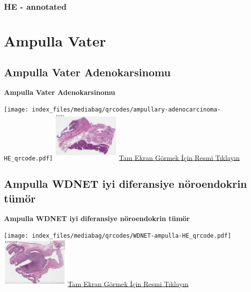 \documentclass[
  letterpaper,
  DIV=11,
  numbers=noendperiod]{scrreprt}
\begin{document}
\hypertarget{he---annotated-1}{%
\subsection{HE - annotated}\label{he---annotated-1}}

\hypertarget{sec-ampulla-vater}{%
\chapter{Ampulla Vater}\label{sec-ampulla-vater}}

\hypertarget{sec-ampulla-vater-adenokarsinomu}{%
\section{Ampulla Vater
Adenokarsinomu}\label{sec-ampulla-vater-adenokarsinomu}}

\textbf{Ampulla Vater Adenokarsinomu}

\texttt{[image: index\_files/mediabag/qrcodes/ampullary-adenocarcinoma-HE\_qrcode.pdf]}
\href{https://images.patolojiatlasi.com/ampullary-adenocarcinoma/HE.html}{\includegraphics[width=0.25\textwidth,height=\textheight]{./screenshots/thumbnail_ampullary-adenocarcinoma.png}}
\href{https://images.patolojiatlasi.com/ampullary-adenocarcinoma/HE.html}{Tam
Ekran Görmek İçin Resmi Tıklayın}

\hypertarget{sec-WDNET-ampulla}{%
\section{Ampulla WDNET iyi diferansiye nöroendokrin
tümör}\label{sec-WDNET-ampulla}}

\textbf{Ampulla WDNET iyi diferansiye nöroendokrin tümör}

\texttt{[image: index\_files/mediabag/qrcodes/WDNET-ampulla-HE\_qrcode.pdf]}
\href{https://images.patolojiatlasi.com/WDNET-ampulla/HE.html}{\includegraphics[width=0.25\textwidth,height=\textheight]{./screenshots/thumbnail_WDNET-ampulla.png}}
\href{https://images.patolojiatlasi.com/WDNET-ampulla/HE.html}{Tam Ekran
Görmek İçin Resmi Tıklayın}
\end{document}
